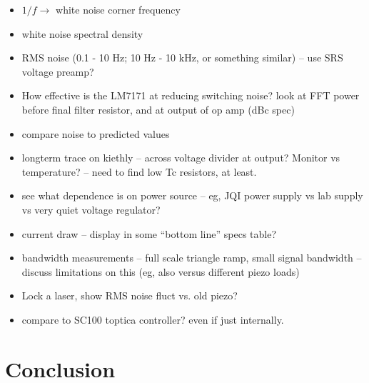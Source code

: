 \documentclass[aip,rsi,reprint]{revtex4-1} %
\begin{document}
\begin{itemize}
\item $1/f \rightarrow$ white noise corner frequency
\item white noise spectral density
\item RMS noise (0.1 - 10 Hz; 10 Hz - 10 kHz, or something similar) -- use SRS voltage preamp?
\item How effective is the LM7171 at reducing switching noise? look at FFT power before final filter resistor, and at output of op amp (dBc spec)
\item compare noise to predicted values
\item longterm trace on kiethly -- across voltage divider at output? Monitor vs temperature? -- need to find low Tc resistors, at least.
\item see what dependence is on power source -- eg, JQI power supply vs lab supply vs very quiet voltage regulator?
\item current draw -- display in some ``bottom line'' specs table?
\item bandwidth measurements -- full scale triangle ramp, small signal bandwidth -- discuss limitations on this (eg, also versus different piezo loads)
\item Lock a laser, show RMS noise fluct vs. old piezo?
\item compare to SC100 toptica controller? even if just internally.
\end{itemize}

\section{Conclusion}
\label{Sec:Conclusion}



%
%
\end{document}
